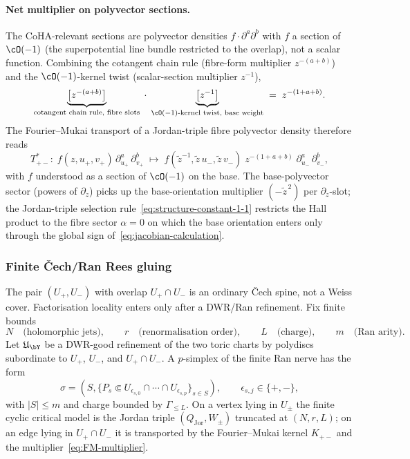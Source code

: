\paragraph{Net multiplier on polyvector sections.}
The CoHA-relevant sections are polyvector densities $f \cdot \partial^a
\partial^b$ with $f$ a section of $\cO(-1)$ (the superpotential line
bundle restricted to the overlap), not a scalar function. Combining the
cotangent chain rule (fibre-form multiplier $z^{-(a+b)}$) and the
$\cO(-1)$-kernel twist (scalar-section multiplier $z^{-1}$),
\[
 \underbrace{\bigl[z^{-(a+b)}\bigr]}_{\text{cotangent chain rule, fibre slots}}
 \;\cdot\;
 \underbrace{\bigl[z^{-1}\bigr]}_{\cO(-1)\text{-kernel twist, base weight}}
 \;=\;
 z^{-(1 + a + b)}.
\]
The Fourier--Mukai transport of a Jordan-triple fibre polyvector density
therefore reads
\begin{equation}\label{eq:FM-multiplier}
 T_{+-}^* :\;
 f(z, u_+, v_+)\, \partial_{u_+}^a\, \partial_{v_+}^b
 \;\longmapsto\;
 f(\tilde z^{-1}, \tilde z\, u_-, \tilde z\, v_-)\;
 z^{-(1 + a + b)}\;
 \partial_{u_-}^a\, \partial_{v_-}^b,
\end{equation}
with $f$ understood as a section of $\cO(-1)$ on the base. The
base-polyvector sector (powers of $\partial_z$) picks up the
base-orientation multiplier $(-\tilde z^{\,2})$ per $\partial_z$-slot; the
Jordan-triple selection rule~\eqref{eq:structure-constant-1-1} restricts
the Hall product to the fibre sector $\alpha = 0$ on which the base
orientation enters only through the global sign
of~\eqref{eq:jacobian-calculation}.

\subsubsection{Finite \v{C}ech/Ran Rees gluing}

The pair $(U_+, U_-)$ with overlap $U_+ \cap U_-$ is an ordinary
\v{C}ech spine, not a Weiss cover. Factorisation locality enters only
after a DWR/Ran refinement. Fix finite bounds
\[
 N\quad\text{(holomorphic jets)},\qquad
 r\quad\text{(renormalisation order)},\qquad
 L\quad\text{(charge)},\qquad
 m\quad\text{(Ran arity)}.
\]
Let $\mathfrak U_{\bY}$ be a DWR-good refinement of the two toric charts
by polydiscs subordinate to $U_+$, $U_-$, and $U_+\cap U_-$. A
$p$-simplex of the finite Ran nerve has the form
\[
 \sigma=(S,\{P_s\Subset U_{\epsilon_{s,0}}\cap\cdots\cap
 U_{\epsilon_{s,p}}\}_{s\in S}),
 \qquad
 \epsilon_{s,j}\in\{+,-\},
\]
with $|S|\leq m$ and charge bounded by $\Gamma_{\leq L}$. On a vertex
lying in $U_\pm$ the finite cyclic critical model is the Jordan triple
$(Q_{\mathrm{Jor}},W_\pm)$ truncated at $(N,r,L)$; on an edge lying in
$U_+\cap U_-$ it is transported by the Fourier--Mukai kernel
$K_{+-}$ and the multiplier~\eqref{eq:FM-multiplier}.

